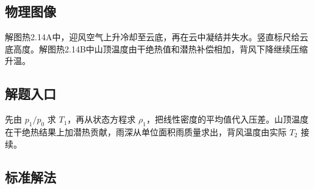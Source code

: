 \documentclass[UTF8,fontset=fandol,a4paper,11pt]{ctexart}
\begin{document}


\subsection*{物理图像}

解图热2.14A中，迎风空气上升冷却至云底，再在云中凝结并失水。竖直标尺给云底高度。解图热2.14B中山顶温度由干绝热值和潜热补偿相加，背风下降继续压缩升温。



\subsection*{解题入口}

先由 $p_1/p_0$ 求 $T_1$，再从状态方程求 $\rho_1$，把线性密度的平均值代入压差。山顶温度在干绝热结果上加潜热贡献，雨深从单位面积雨质量求出，背风温度由实际 $T_2$ 接续。




\subsection*{标准解法}
\end{document}
